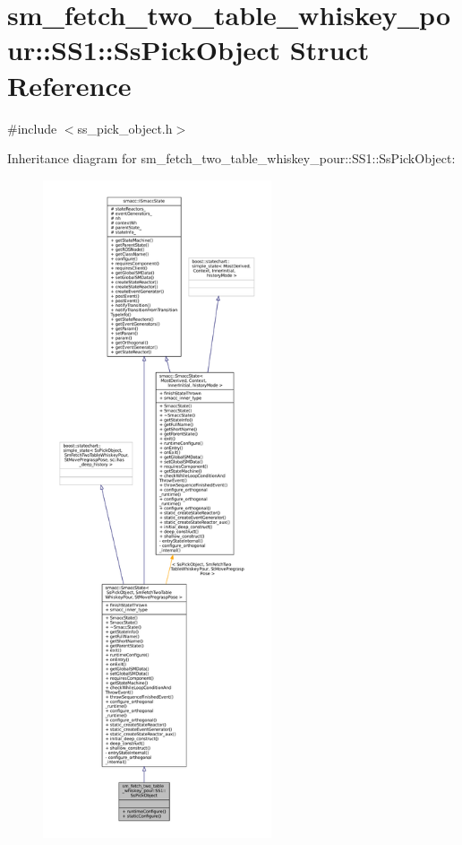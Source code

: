 \hypertarget{structsm__fetch__two__table__whiskey__pour_1_1SS1_1_1SsPickObject}{}\section{sm\+\_\+fetch\+\_\+two\+\_\+table\+\_\+whiskey\+\_\+pour\+:\+:S\+S1\+:\+:Ss\+Pick\+Object Struct Reference}
\label{structsm__fetch__two__table__whiskey__pour_1_1SS1_1_1SsPickObject}


{\ttfamily \#include $<$ss\+\_\+pick\+\_\+object.\+h$>$}



Inheritance diagram for sm\+\_\+fetch\+\_\+two\+\_\+table\+\_\+whiskey\+\_\+pour\+:\+:S\+S1\+:\+:Ss\+Pick\+Object\+:
\nopagebreak
\begin{figure}[H]
\begin{center}
\leavevmode
\includegraphics[height=550pt]{structsm__fetch__two__table__whiskey__pour_1_1SS1_1_1SsPickObject__inherit__graph}
\end{center}
\end{figure}


